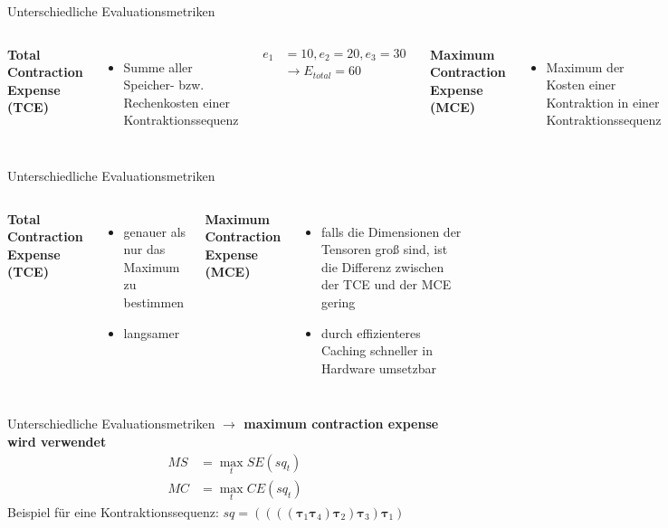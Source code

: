 \documentclass{beamer}
\begin{document}
\begin{frame}{Unterschiedliche Evaluationsmetriken}
	\begin{columns}[]

		\textbf{Total Contraction Expense (TCE)}
		\begin{itemize}
			\item Summe aller Speicher- bzw. Rechenkosten einer Kontraktionssequenz
		\end{itemize}
		\begin{align*}
			e_1 & = 10, e_2 = 20, e_3 = 30   \\
			    & \rightarrow E_{total} = 60
		\end{align*}


		\textbf{Maximum Contraction Expense (MCE)}
		\begin{itemize}
			\item Maximum der Kosten einer Kontraktion in einer Kontraktionssequenz
		\end{itemize}
		\begin{align*}
			e_1 & = 10, e_2 = 20, e_3 = 30 \\
			    & \rightarrow E_{max} = 30
		\end{align*}
	\end{columns}
\end{frame}

\begin{frame}{Unterschiedliche Evaluationsmetriken}
	\begin{columns}
		\textbf{Total Contraction Expense (TCE)}
		\begin{itemize}
			\item genauer als nur das Maximum zu bestimmen
			\item langsamer
		\end{itemize}


		\textbf{Maximum Contraction Expense (MCE)}
		\begin{itemize}
			\item falls die Dimensionen der Tensoren groß sind, ist die Differenz zwischen der TCE und der MCE gering
			\item durch effizienteres Caching schneller in Hardware umsetzbar
		\end{itemize}

	\end{columns}
\end{frame}

\begin{frame}{Unterschiedliche Evaluationsmetriken}
	\textbf{$\rightarrow$ maximum contraction expense wird verwendet}
	\begin{align*}
		MS & = \max_t SE(sq_t) \\ MC &= \max_t CE(sq_t)
	\end{align*}
	Beispiel für eine Kontraktionssequenz:
	$sq = ((((\bm{\tau}_{1} \bm{\tau}_{4}) \bm{\tau}_{2}) \bm{\tau}_{3}) \bm{\tau}_{1})$
\end{frame}
\end{document}
